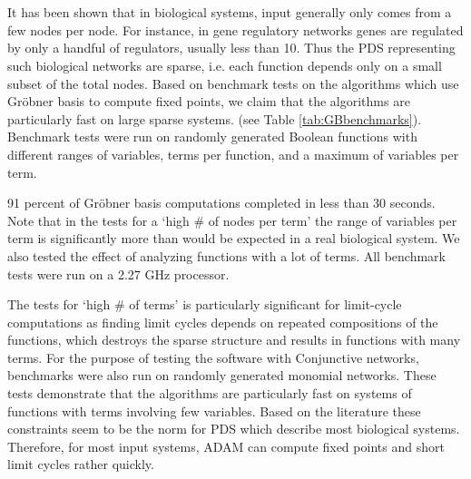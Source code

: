 \documentclass[11pt]{amsart}
\begin{document}
\section{}
It has been shown that in biological systems, input generally only comes from
a few nodes per node.  For instance, in gene regulatory networks genes are
regulated by only a handful of regulators, usually less than 10.
\cite{Ting:1999}  Thus the PDS representing such biological networks are
sparse, i.e. each function depends only on a small subset of the total nodes.
Based on benchmark tests on the algorithms which use Gr\"obner basis to
compute fixed points, we claim that the algorithms are particularly fast on large sparse systems. (see Table \ref{tab:GBbenchmarks}).  Benchmark tests were run on randomly generated Boolean functions with different ranges of variables, terms per function, and a maximum of variables per term.

91 percent of Gr\"obner basis computations completed in less than 30 seconds.  Note that in the tests for a `high \# of nodes per term' the range of variables per term is significantly more than would be expected in a real biological system.  We also tested the effect of analyzing functions with a lot of terms.  All benchmark tests were run on a 2.27 GHz processor.

The tests for `high \# of terms' is particularly significant for limit-cycle
computations as finding limit cycles depends on repeated compositions of the
functions, which destroys the sparse structure and results in functions with
many terms.  For the purpose of testing the software with Conjunctive
networks, benchmarks were also run on randomly generated monomial networks.
These tests demonstrate that the algorithms are particularly fast on systems of functions with terms involving few variables.  Based on the literature these constraints seem to be the norm for PDS which describe most biological systems.  Therefore, for most input systems, ADAM can compute fixed points and short limit cycles rather quickly.
\end{document}
